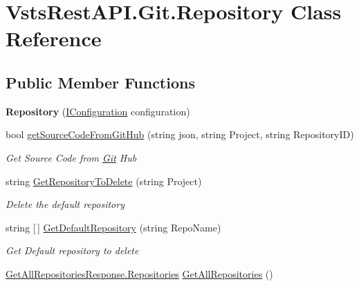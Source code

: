 \hypertarget{class_vsts_rest_a_p_i_1_1_git_1_1_repository}{}\section{Vsts\+Rest\+A\+P\+I.\+Git.\+Repository Class Reference}
\label{class_vsts_rest_a_p_i_1_1_git_1_1_repository}
\subsection*{Public Member Functions}
\begin{DoxyCompactItemize}
\item 
\mbox{\label{class_vsts_rest_a_p_i_1_1_git_1_1_repository_a3eaf35b7d85a3b7a1d736eaf25e5338f}} 
{\bfseries Repository} (\mbox{\hyperlink{interface_vsts_rest_a_p_i_1_1_i_configuration}{I\+Configuration}} configuration)
\item 
bool \mbox{\hyperlink{class_vsts_rest_a_p_i_1_1_git_1_1_repository_a46daa5b9a35a6efb4267c6ee4494df31}{get\+Source\+Code\+From\+Git\+Hub}} (string json, string Project, string Repository\+ID)
\begin{DoxyCompactList}\small\item\em Get Source Code from \mbox{\hyperlink{namespace_vsts_rest_a_p_i_1_1_git}{Git}} Hub \end{DoxyCompactList}\item 
string \mbox{\hyperlink{class_vsts_rest_a_p_i_1_1_git_1_1_repository_adb713f76b948694752aff2d111a3ed85}{Get\+Repository\+To\+Delete}} (string Project)
\begin{DoxyCompactList}\small\item\em Delete the default repository \end{DoxyCompactList}\item 
string \mbox{[}$\,$\mbox{]} \mbox{\hyperlink{class_vsts_rest_a_p_i_1_1_git_1_1_repository_a0188a1509a001dc7bafc7ca6829daa8e}{Get\+Default\+Repository}} (string Repo\+Name)
\begin{DoxyCompactList}\small\item\em Get Default repository to delete \end{DoxyCompactList}\item 
\mbox{\hyperlink{class_vsts_rest_a_p_i_1_1_viewmodel_1_1_repository_1_1_get_all_repositories_response_1_1_repositories}{Get\+All\+Repositories\+Response.\+Repositories}} \mbox{\hyperlink{class_vsts_rest_a_p_i_1_1_git_1_1_repository_a6cf8983ffb2539bb9d3d5eb2a1657c28}{Get\+All\+Repositories}} ()

\end{DoxyCompactItemize}

